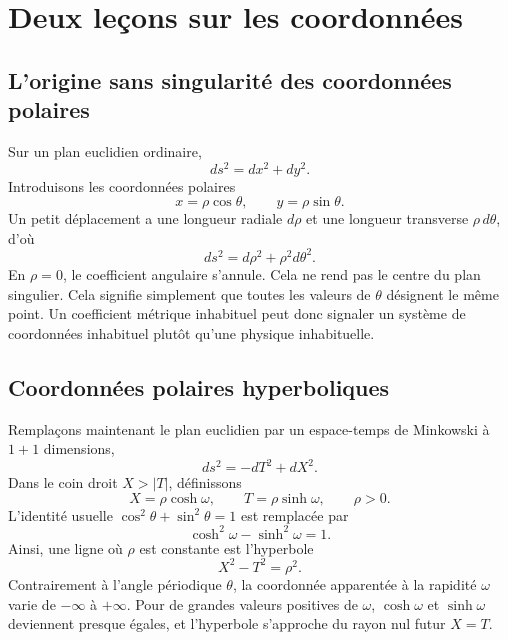 \section{Deux leçons sur les coordonnées}

\subsection{L’origine sans singularité des coordonnées polaires}

Sur un plan euclidien ordinaire,
\begin{equation}
ds^2=dx^2+dy^2.
\end{equation}
Introduisons les coordonnées polaires
\begin{equation}
x=\rho\cos\theta,
\qquad
y=\rho\sin\theta .
\end{equation}
Un petit déplacement a une longueur radiale \(d\rho\) et une longueur transverse \(\rho\,d\theta\), d’où
\begin{equation}
ds^2=d\rho^2+\rho^2d\theta^2.
\label{eq:l03-polar}
\end{equation}
En \(\rho=0\), le coefficient angulaire s’annule. Cela ne rend pas le centre du plan singulier. Cela signifie simplement que toutes les valeurs de \(\theta\) désignent le même point. Un coefficient métrique inhabituel peut donc signaler un système de coordonnées inhabituel plutôt qu’une physique inhabituelle.

\subsection{Coordonnées polaires hyperboliques}

Remplaçons maintenant le plan euclidien par un espace-temps de Minkowski à \(1+1\) dimensions,
\begin{equation}
ds^2=-dT^2+dX^2.
\end{equation}
Dans le coin droit \(X>|T|\), définissons
\begin{equation}
X=\rho\cosh\omega,
\qquad
T=\rho\sinh\omega,
\qquad \rho>0 .
\label{eq:l03-rindler-transform}
\end{equation}
L’identité usuelle \(\cos^2\theta+\sin^2\theta=1\) est remplacée par
\begin{equation}
\cosh^2\omega-\sinh^2\omega=1.
\end{equation}
Ainsi, une ligne où \(\rho\) est constante est l’hyperbole
\begin{equation}
X^2-T^2=\rho^2.
\end{equation}
Contrairement à l’angle périodique \(\theta\), la coordonnée apparentée à la rapidité \(\omega\) varie de \(-\infty\) à \(+\infty\). Pour de grandes valeurs positives de \(\omega\), \(\cosh\omega\) et \(\sinh\omega\) deviennent presque égales, et l’hyperbole s’approche du rayon nul futur \(X=T\).

